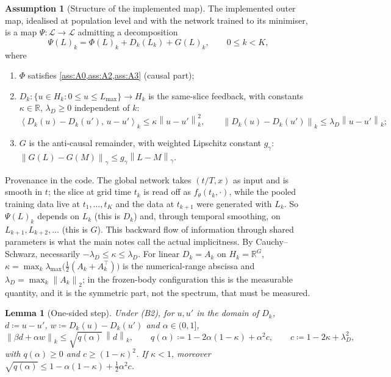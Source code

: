 \documentclass[11pt,a4paper]{article}
\theoremstyle{plain}
\newtheorem{lemma}[theorem]{Lemma}
\theoremstyle{definition}
\newtheorem{assumption}{Assumption}
\theoremstyle{definition}
\newcommand{\R}{\mathbb{R}}
\newcommand{\norm}[1]{\left\lVert #1 \right\rVert}
\newcommand{\ip}[2]{\left\langle #1,\, #2 \right\rangle}
\newcommand{\Lev}{L}
\newcommand{\Phimap}{\Phi}
\newcommand{\Psimap}{\Psi}
\newcommand{\Lset}{\mathcal{L}}
\newcommand{\Lmax}{L_{\max}}
\begin{document}
\begin{assumption}[Structure of the implemented map]\label{ass:B}
The implemented outer map, idealised at population level and with the network trained to its minimiser, is a map $\Psimap \colon \Lset \to \Lset$ admitting a decomposition
\begin{equation}\label{eq:decomp}
  \Psimap(\Lev)_k = \Phimap(\Lev)_k + D_k(\Lev_k) + G(\Lev)_k, \qquad 0 \le k < K,
\end{equation}
where
\begin{enumerate}
\item[(B1)] $\Phimap$ satisfies \cref{ass:A0,ass:A2,ass:A3} (causal part);
\item[(B2)] $D_k \colon \{u \in H_k : 0 \le u \le \Lmax\} \to H_k$ is the same-slice feedback, with constants $\kappa \in \R$, $\lambda_D \ge 0$ independent of $k$:
\[
  \ip{D_k(u) - D_k(u')}{u - u'}_k \le \kappa \norm{u - u'}_k^2,
  \qquad
  \norm{D_k(u) - D_k(u')}_k \le \lambda_D \norm{u - u'}_k ;
\]
\item[(B3)] $G$ is the anti-causal remainder, with weighted Lipschitz constant $g_\gamma$: $\norm{G(\Lev) - G(M)}_\gamma \le g_\gamma \norm{\Lev - M}_\gamma$.
\end{enumerate}
\end{assumption}

Provenance in the code. The global network takes $(t/T, x)$ as input and is smooth in $t$; the slice at grid time $t_k$ is read off as $f_\theta(t_k, \cdot)$, while the pooled training data live at $t_1, \dots, t_K$ and the data at $t_{k+1}$ were generated with $\Lev_k$. So $\Psimap(\Lev)_k$ depends on $\Lev_k$ (this is $D_k$) and, through temporal smoothing, on $\Lev_{k+1}, \Lev_{k+2}, \dots$ (this is $G$). This backward flow of information through shared parameters is what the main notes call the actual implicitness. By Cauchy--Schwarz, necessarily $-\lambda_D \le \kappa \le \lambda_D$. For linear $D_k = A_k$ on $H_k = \R^G$, $\kappa = \max_k \lambda_{\max}\bigl( \tfrac12 (A_k + A_k^\top) \bigr)$ is the numerical-range abscissa and $\lambda_D = \max_k \norm{A_k}_2$; in the frozen-body configuration this is the measurable quantity, and it is the symmetric part, not the spectrum, that must be measured.

\begin{lemma}[One-sided step]\label{lem:onesided}
Under (B2), for $u, u'$ in the domain of $D_k$, $d \coloneqq u - u'$, $w \coloneqq D_k(u) - D_k(u')$ and $\alpha \in (0, 1]$,
\[
  \norm{\beta d + \alpha w}_k \le \sqrt{q(\alpha)}\, \norm{d}_k,
  \qquad q(\alpha) \coloneqq 1 - 2\alpha(1 - \kappa) + \alpha^2 c,
  \qquad c \coloneqq 1 - 2\kappa + \lambda_D^2,
\]
with $q(\alpha) \ge 0$ and $c \ge (1 - \kappa)^2$. If $\kappa < 1$, moreover $\sqrt{q(\alpha)} \le 1 - \alpha(1 - \kappa) + \tfrac12 \alpha^2 c$.
\end{lemma}
\end{document}
